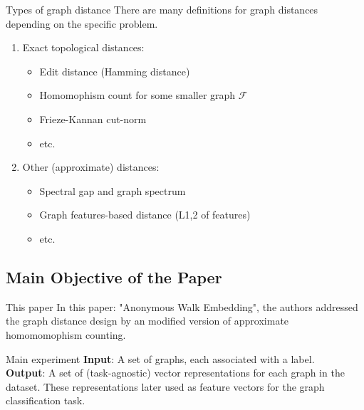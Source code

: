 \documentclass{beamer}
\begin{document}
    \begin{frame}{Types of graph distance}
        There are many definitions for graph distances depending on the specific
        problem.
        \pause
        \begin{enumerate}
            \item Exact topological distances:
            \pause
            \begin{itemize}
                \item Edit distance (Hamming distance)
                \pause
                \item Homomophism count for some smaller graph $\mathcal{F}$
                \pause
                \item Frieze-Kannan cut-norm
                \pause
                \item etc.
            \end{itemize}
            \item Other (approximate) distances:
            \pause
            \begin{itemize}
                \item Spectral gap and graph spectrum
                \pause
                \item Graph features-based distance (L1,2 of features)
                \pause
                \item etc.
            \end{itemize}
        \end{enumerate}
    \end{frame}

    \subsection{Main Objective of the Paper}

    \begin{frame}{This paper}
        In this paper: "Anonymous Walk Embedding", the authors addressed the 
        \textcolor{example}{graph distance} design by an modified version
        of approximate homomomophism counting.

        \vspace{1em}

        \pause

        \begin{block}{Main experiment}
            \textbf{Input}: A set of graphs, each associated with a label. \\
            \textbf{Output}: A set of (task-agnostic) vector representations
            for each graph in the dataset. These representations later used as
            feature vectors for the graph classification task.
        \end{block}
    \end{frame}
\end{document}
